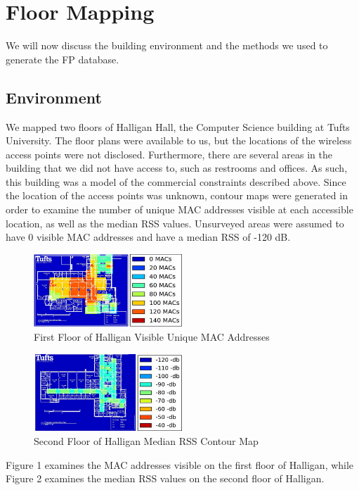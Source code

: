 \documentclass[conference]{IEEEtran}
\begin{document}
\section{Floor Mapping}
We will now discuss the building environment and the methods we used to generate the FP database.
\subsection{Environment}
We mapped two floors of Halligan Hall, the Computer Science building at Tufts University. The floor plans were available to us, but the locations of the wireless access points were not disclosed. Furthermore, there are several areas in the building that we did not have access to, such as restrooms and offices. As such, this building was a model of the commercial constraints described above. Since the location of the access points was unknown, contour maps were generated in order to examine the number of unique MAC addresses visible at each accessible location, as well as the median RSS values. Unsurveyed areas were assumed to have 0 visible MAC addresses and have a median RSS of -120 dB. 
 
\begin{figure}[h!]
  \centering
    \includegraphics[width=0.5\textwidth]{APContour}
    \caption{First Floor of Halligan Visible Unique MAC Addresses}
\end{figure}


\begin{figure}[h!]
  \centering
    \includegraphics[width=0.5\textwidth]{dbContour}
   \caption{Second Floor of Halligan Median RSS Contour Map}
\end{figure}

Figure 1 examines the MAC addresses visible on the first floor of Halligan, while Figure 2 examines the median RSS values on the second floor of Halligan.
\end{document}
